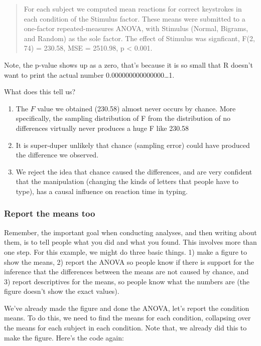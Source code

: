 \documentclass[]{book}
\begin{document}
\begin{quote}
For each subject we computed mean reactions for correct keystrokes in
each condition of the Stimulus factor. These means were submitted to a
one-factor repeated-measures ANOVA, with Stimulus (Normal, Bigrams, and
Random) as the sole factor. The effect of Stimulus was signficant, F(2,
74) = 230.58, MSE = 2510.98, p \textless{} 0.001.
\end{quote}

Note, the p-value shows up as a zero, that's because it is so small that
R doesn't want to print the actual number 0.000000000000000\ldots{}1.

What does this tell us?

\begin{enumerate}
\def\labelenumi{\arabic{enumi}.}
\item
  The \(F\) value we obtained (230.58) almost never occurs by chance.
  More specifically, the sampling distribution of F from the
  distribution of no differences virtually never produces a huge F like
  230.58
\item
  It is super-duper unlikely that chance (sampling error) could have
  produced the difference we observed.
\item
  We reject the idea that chance caused the differences, and are very
  confident that the manipulation (changing the kinds of letters that
  people have to type), has a causal influence on reaction time in
  typing.
\end{enumerate}

\subsubsection{Report the means too}\label{report-the-means-too}

Remember, the important goal when conducting analyses, and then writing
about them, is to tell people what you did and what you found. This
involves more than one step. For this example, we might do three basic
things. 1) make a figure to show the means, 2) report the ANOVA so
people know if there is support for the inference that the differences
between the means are not caused by chance, and 3) report descriptives
for the means, so people know what the numbers are (the figure doesn't
show the exact values).

We've already made the figure and done the ANOVA, let's report the
condition means. To do this, we need to find the means for each
condition, collapsing over the means for each subject in each condition.
Note that, we already did this to make the figure. Here's the code
again:
\end{document}
